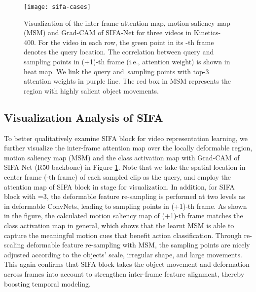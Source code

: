 \documentclass[10pt,twocolumn,letterpaper]{article}
\begin{document}
\begin{figure}[!tb]
\vspace{-0.22in}
\centering\texttt{[image: sifa-cases]}
\vspace{-0.13in}
\caption{\small Visualization of the inter-frame attention map, motion saliency map (MSM) and Grad-CAM \cite{Grad-CAM} of SIFA-Net for three videos in Kinetics-400. For the video in each row, the green point in its -th frame denotes the query location. The correlation between query and sampling points in (+1)-th frame (i.e., attention weight) is shown in heat map. We link the query and~sampling points with top-3 attention weights in purple line. The red box in MSM represents the region with highly salient object movements.}
\label{fig5:1}
\vspace{-0.27in}
\end{figure}


\subsection{Visualization Analysis of SIFA}
To better qualitatively examine SIFA block for video representation learning, we further visualize the inter-frame attention map over the locally deformable region, motion saliency map (MSM) and the class activation map with Grad-CAM \cite{Grad-CAM} of SIFA-Net (R50 backbone) in Figure \ref{fig5:1}. Note that we take the spatial location in center frame (-th frame) of each sampled clip as the query, and employ the attention map of SIFA block in  stage for visualization. In addition, for SIFA block with =3, the deformable feature re-sampling is performed at two levels as in deformable ConvNets, leading to  sampling points in (+1)-th frame. As shown in the figure, the calculated motion saliency map of (+1)-th frame matches the class activation map in general, which shows that the learnt MSM is able to capture the meaningful motion cues that benefit action classification. Through re-scaling deformable feature re-sampling with MSM, the sampling points are nicely adjusted according to the objects' scale, irregular shape, and large movements. This again confirms that SIFA block takes the object movement and deformation across frames into account to strengthen inter-frame feature alignment, thereby boosting temporal modeling.
\end{document}
